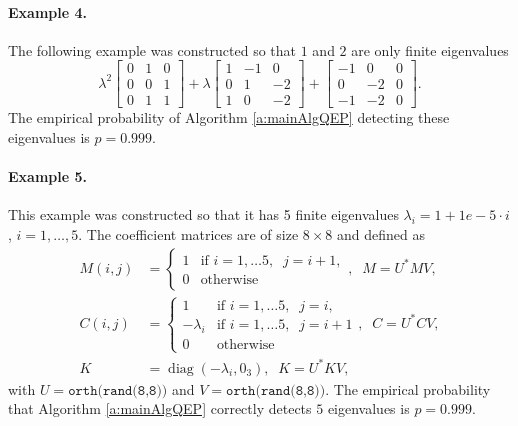 \documentclass[12pt]{article}
\DeclareMathOperator{\diag}{diag}
\begin{document}
\paragraph{Example 4.}
The following example was constructed so that $1$ and $2$ are only finite eigenvalues
\begin{equation*}
    \lambda^2 \begin{bmatrix}
        0 & 1 & 0\\0 & 0 & 1\\0 & 1 & 1
    \end{bmatrix} + \lambda \begin{bmatrix}
        1 & -1 & 0\\0 & 1 & -2\\1 & 0 & -2
    \end{bmatrix} + \begin{bmatrix}
        -1 & 0 & 0\\0 & -2 & 0\\-1 & -2 & 0
    \end{bmatrix}.
\end{equation*}
The empirical probability of Algorithm \ref{a:mainAlgQEP} detecting these eigenvalues is $p = 0.999$.
\paragraph{Example 5.}
This example was constructed so that it has 5 finite eigenvalues $\lambda_i = 1+1e-5\cdot i$, $i=1,\ldots,5$. The coefficient matrices are of size $8\times 8$ and defined as
\begin{align*}
    M(i,j) &= \begin{cases}
    1 & \text{if } i=1,\ldots 5,\;\; j=i+1,\\
    0 & \text{otherwise}
    \end{cases},\;\; M = U^*MV,\\
    C(i,j) & = \begin{cases}
    1 & \text{if }i=1,\ldots 5, \;\;j=i,\\
    -\lambda_i & \text{if }i=1,\ldots 5, \;\;j=i+1\\
    0 & \text{otherwise}
    \end{cases},\;\; C = U^*CV,\\
    K &= \diag(-\lambda_i,0_3),\;\;K = U^*KV,
\end{align*}
with $U = \texttt{orth(rand(8,8))}$ and $V = \texttt{orth(rand(8,8))}$. The empirical probability that Algorithm \ref{a:mainAlgQEP} correctly detects $5$ eigenvalues is $p = 0.999$.
\end{document}
